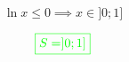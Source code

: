 \documentclass[12pt]{article}
\begin{document}
\begin{enumerate}
\begin{itemize}
$$\ln x \leq 0\implies x\in]0; 1]$$

$$\textcolor{green}{\boxed{S=]0; 1]}}$$
\end{itemize}
\end{enumerate}
\end{document}

